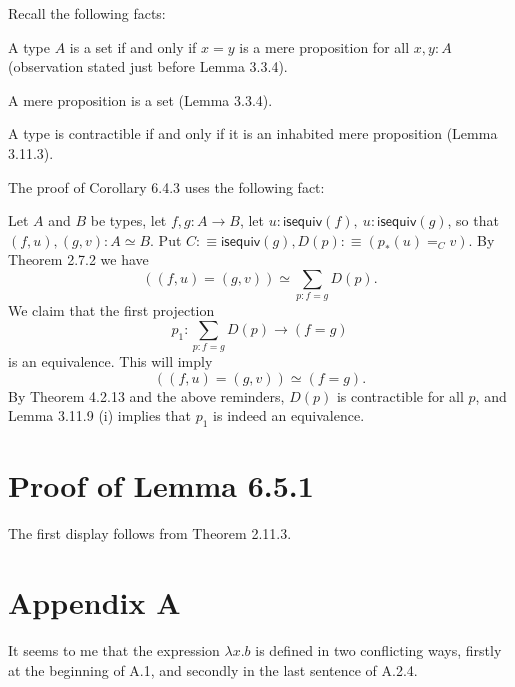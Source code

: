 \documentclass[12pt]{article}
\begin{document}
Recall the following facts: 

A type $A$ is a set if and only if $x=y$ is a mere proposition for all $x,y:A$ (observation stated just before Lemma 3.3.4). 

A mere proposition is a set (Lemma 3.3.4).

A type is contractible if and only if it is an inhabited mere proposition (Lemma 3.11.3). 

The proof of Corollary 6.4.3 uses the following fact:

Let $A$ and $B$ be types, let $f,g:A\to B$, let $u:\mathsf{isequiv}(f),\ u:\mathsf{isequiv}(g)$, so that $(f,u),(g,v):A\simeq B$. Put $C:\equiv\mathsf{isequiv}(g), D(p):\equiv(p_*(u)=_Cv)$. By Theorem 2.7.2 we have 
$$
((f,u)=(g,v))\simeq\sum_{p:f=g}D(p).
$$ 
We claim that the first projection 
$$
p_1:\sum_{p:f=g}D(p)\to(f=g)
$$ 
is an equivalence. This will imply 
$$
((f,u)=(g,v))\simeq(f=g).
$$ 
By Theorem 4.2.13 and the above reminders, $D(p)$ is contractible for all $p$, and Lemma 3.11.9 (i) implies that $p_1$ is indeed an equivalence.


\section{Proof of Lemma 6.5.1}

The first display follows from Theorem 2.11.3.


\section{Appendix A}

It seems to me that the expression $\lambda x.b$ is defined in two conflicting ways, firstly at the beginning of A.1, and secondly in the last sentence of A.2.4. 
\end{document}
